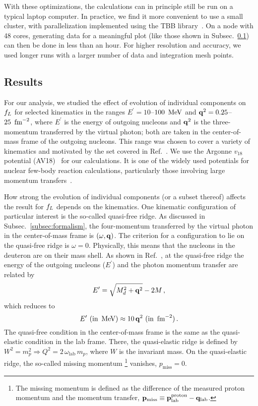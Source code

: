 	With these optimizations, the calculations can in principle still be run on a
	typical laptop computer.  In practice, we find it more convenient to use a
	small cluster, with parallelization implemented using the TBB
	library~\cite{TBB:0915}.  On a node with 48 cores, generating data for a
	meaningful plot (like those shown in Subsec.~\ref{subsec:Results}) can then
	be done	in less than an hour.  For higher resolution and accuracy, we used
	longer runs	with a larger number of data and integration mesh points.

	\subsection{Results}
	\label{subsec:Results}

	For our analysis, we studied the effect of evolution of individual components
	on $f_L$ for selected kinematics in the ranges $E^\prime = 10$--$100~\,\text{MeV}$ and
	$\mathbf{q}^2 = 0.25$--$25~\,\text{fm}^{-2}$, where $E^\prime$ is the energy of outgoing
	nucleons and $\mathbf{q}^2$ is the three-momentum transferred by the virtual
	photon; both are taken in the center-of-mass frame of the outgoing nucleons.
	This range was chosen to cover a variety of kinematics and motivated by the
	set covered in Ref.~\cite{Yang:2013rza}.  We use the Argonne $v_{18}$
	potential
	(AV18)~\cite{Wiringa:1994wb} for our calculations.  It is one of the widely
	used potentials for nuclear few-body reaction calculations, particularly those
	involving large momentum transfers~\cite{Carlson:1997qn,Carlson:2014vla}.

	How strong the evolution of individual components (or a subset thereof)
	affects	the result for $f_L$ depends on the kinematics.  One kinematic
	configuration of particular interest is the so-called quasi-free ridge.  As
	discussed in Subsec.~\ref{subsec:formalism}, the four-momentum transferred by
	the	virtual photon in the center-of-mass frame is $(\omega, \mathbf{q})$.  The
	criterion for a configuration to lie on the quasi-free ridge is $\omega = 0$.
	Physically, this means that the nucleons in the deuteron are on their mass
	shell.  As shown in Ref.~\cite{Yang:2013rza}, at the quasi-free ridge the
	energy of the outgoing nucleons ($E^\prime$) and the photon momentum transfer
	are related by
	\begin{equation}
	 E^\prime = \sqrt{M_d^2 + \mathbf{q}^2} - 2 M \,,
	 \label{eq:quasi_free_condition_exact}
	\end{equation}
	which reduces to
	\begin{equation}
	E^\prime~\text{(in~$\,\text{MeV}$)} \approx 10 \, \mathbf{q}^2~\text{(in~$\,\text{fm}^{-2}$)} \,.
	\label{eq:quasi_free_condition}
	\end{equation}
	The quasi-free
	condition in the center-of-mass frame is the same as the quasi-elastic
	condition in the lab frame.  There, the quasi-elastic ridge is defined by $W^2
	= m_p^2 \Rightarrow Q^2 = 2 \, \omega_\text{lab} \, m_p$, where $W$ is
	the invariant mass.  On the quasi-elastic ridge, the so-called missing
	momentum%
	\footnote{The missing momentum is defined as the difference of
	the measured proton momentum and the momentum transfer, $\mathbf{p}_\text{miss}
	\equiv \mathbf{p}_\text{lab}^\text{proton} - \mathbf{q}_\text{lab}$.}
	vanishes, $p_\text{miss} = 0$.

